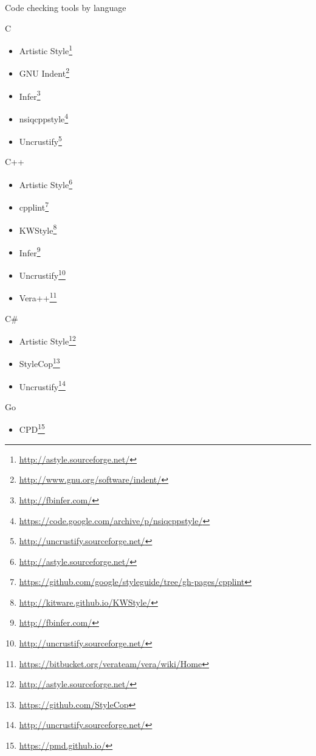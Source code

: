 \documentclass[presentation]{beamer}
\newcommand{\fnurl}[1]{\footnote{\url{#1}}}
\begin{document}
\begin{frame}{Code checking tools by language}
    \begin{block}{C}
        \begin{itemize}
            \item Artistic Style\fnurl{http://astyle.sourceforge.net/}
            \item GNU Indent\fnurl{http://www.gnu.org/software/indent/}
            \item Infer\fnurl{http://fbinfer.com/}
            \item nsiqcppstyle\fnurl{https://code.google.com/archive/p/nsiqcppstyle/}
            \item Uncrustify\fnurl{http://uncrustify.sourceforge.net/}
        \end{itemize}
    \end{block}
    \begin{block}{C++}
        \begin{itemize}
            \item Artistic Style\fnurl{http://astyle.sourceforge.net/}
            \item cpplint\fnurl{https://github.com/google/styleguide/tree/gh-pages/cpplint}
            \item KWStyle\fnurl{http://kitware.github.io/KWStyle/}
            \item Infer\fnurl{http://fbinfer.com/}
            \item Uncrustify\fnurl{http://uncrustify.sourceforge.net/}
            \item Vera++\fnurl{https://bitbucket.org/verateam/vera/wiki/Home}
        \end{itemize}
    \end{block}
    \begin{block}{C\#}
        \begin{itemize}
            \item Artistic Style\fnurl{http://astyle.sourceforge.net/}
            \item StyleCop\fnurl{https://github.com/StyleCop}
            \item Uncrustify\fnurl{http://uncrustify.sourceforge.net/}
        \end{itemize}
    \end{block}
    \begin{block}{Go}
        \begin{itemize}
            \item CPD\fnurl{https://pmd.github.io/}

\end{itemize}
\end{block}
\end{frame}
\end{document}
